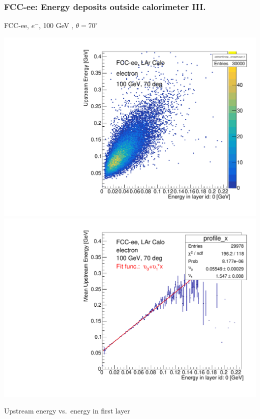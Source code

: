 \documentclass[aspectratio=169]{beamer}
\newcommand{\bluetext}[1]{%
  \textcolor{myBlue}{#1}
}
\newcommand{\redtext}[1]{%
  \textcolor{myRed}{#1}
}
\begin{document}
\begin{frame}
  \frametitle{FCC-ee: Energy deposits outside calorimeter III.}

  \centering
  FCC-ee, $e^{-}$, \redtext{100 GeV}, \bluetext{$\theta = 70^{\circ}$} \\[1.5ex]
  \begin{adjustwidth}{-5mm}{-5mm}
    \includegraphics[width=0.49\linewidth]{figures/2d/hist_upstream_vs_layer_0_70deg_100GeV.pdf}
    \includegraphics[width=0.49\linewidth]{figures/2d/profile_upstream_vs_layer_0_70deg_100GeV.pdf}
  \end{adjustwidth}
  \redtext{Upstream} energy vs.\ energy in first layer
\end{frame}
\end{document}
